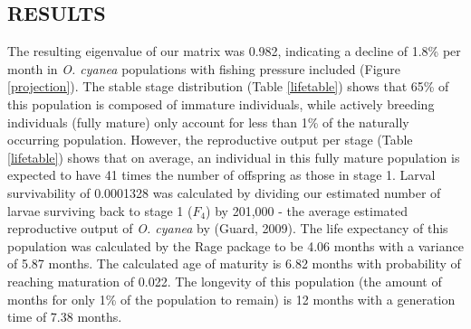 \documentclass[
  12pt,
]{article}
\begin{document}
\begin{table}

\caption{\label{tab:LifeHistory}Existing research and information on the per-stage duration of \emph{O. cyanea}. All existing estimates are from Heukelem (1973), Heukelem (1976), Guard \& Mgaya (2003), Humber et al. (2006), Aina (2009). Note: Heukelem (1976) estimate the time to maturity to be 10-13 months (i.e.~stages 1-3 combined). \label{LifeHistory}}
\centering
{}
\end{table}



\hypertarget{results}{%
\subsection{RESULTS}\label{results}}

The resulting eigenvalue of our matrix was 0.982, indicating a decline of 1.8\% per month in \emph{O. cyanea} populations with fishing pressure included (Figure \ref{projection}). The stable stage distribution (Table \ref{lifetable}) shows that 65\% of this population is composed of immature individuals, while actively breeding individuals (fully mature) only account for less than 1\% of the naturally occurring population. However, the reproductive output per stage (Table \ref{lifetable}) shows that on average, an individual in this fully mature population is expected to have 41 times the number of offspring as those in stage 1. Larval survivability of 0.0001328 was calculated by dividing our estimated number of larvae surviving back to stage 1 (\(F_4\)) by 201,000 - the average estimated reproductive output of \emph{O. cyanea} by (Guard, 2009). The life expectancy of this population was calculated by the Rage package to be 4.06 months with a variance of 5.87 months. The calculated age of maturity is 6.82 months with probability of reaching maturation of 0.022. The longevity of this population (the amount of months for only 1\% of the population to remain) is 12 months with a generation time of 7.38 months.
\end{document}
